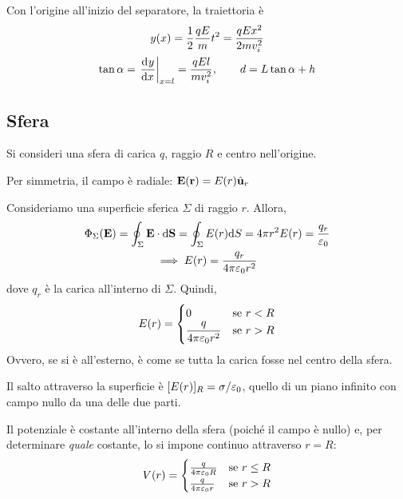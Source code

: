 Con l'origine all'inizio del separatore, la traiettoria è
\begin{gather}
    y(x) = \frac{1}{2} \frac{q E}{m} t^2 = \frac{q E x^2}{2 m v_i^2} \\
    \tan \alpha = \evalat{\der[y]{x}}{x = l} = \frac{qEl}{m v_i^2}, \qquad d = L \tan \alpha + h
\end{gather}


\subsection{Sfera}

Si consideri una sfera di carica $q$, raggio $R$ e centro nell'origine.

Per simmetria, il campo è radiale: $\mathbf{E}(\mathbf{r}) = E(r)\hat{\mathbf{u}}_{r}$

Consideriamo una superficie sferica $\Sigma$ di raggio $r$.
Allora,
\begin{equation}
\begin{gathered}
    \Phi_\Sigma(\mathbf{E}) = \oint_\Sigma \mathbf{E} \cdot \mathrm{d} \mathbf{S} = \oint_\Sigma E(r) \mathrm{d} S= 4\pi r^2 E(r) = \frac{q_r}{\varepsilon_0} \\
    \implies E(r) = \frac{q_r}{4\pi\varepsilon_0 r^2}
\end{gathered}
\end{equation}
dove $q_r$ è la carica all'interno di $\Sigma$.
Quindi,
\begin{equation}
    E(r) = \begin{cases}
        0 & \text{se } r < R \\
        \dfrac{q}{4\pi\varepsilon_0 r^2} & \text{se } r > R
    \end{cases}
\end{equation}
Ovvero, se si è all'esterno, è come se tutta la carica fosse nel centro della sfera.

Il salto attraverso la superficie è $[E(r)]_R = \sigma/\varepsilon_0$, quello di un piano infinito con campo nullo da una delle due parti.

Il potenziale è costante all'interno della sfera (poiché il campo è nullo) e, per determinare \textit{quale} costante, lo si impone continuo attraverso $r = R$:
\begin{equation}
\label{eq:potenziale_sfera}
    V(r) = \begin{cases}
        \frac{q}{4\pi\varepsilon_0 R} & \text{se } r \le R \\
        \frac{q}{4\pi\varepsilon_0 r} & \text{se } r > R
    \end{cases}
\end{equation}



